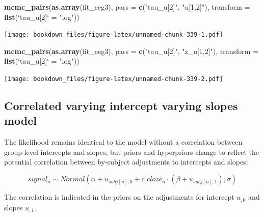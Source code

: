 \documentclass[12pt,]{krantz}
\newenvironment{Shaded}{\begin{snugshade}}{\end{snugshade}}
\newcommand{\DataTypeTok}[1]{\textcolor[rgb]{0.13,0.29,0.53}{#1}}
\newcommand{\KeywordTok}[1]{\textcolor[rgb]{0.13,0.29,0.53}{\textbf{#1}}}
\newcommand{\NormalTok}[1]{#1}
\newcommand{\StringTok}[1]{\textcolor[rgb]{0.31,0.60,0.02}{#1}}
\theoremstyle{definition}
\theoremstyle{definition}
\theoremstyle{definition}
\theoremstyle{remark}
\begin{document}
\begin{Shaded}
\begin{Highlighting}[]
\KeywordTok{mcmc_pairs}\NormalTok{(}\KeywordTok{as.array}\NormalTok{(fit_eeg3), }\DataTypeTok{pars =} \KeywordTok{c}\NormalTok{(}\StringTok{"tau_u[2]"}\NormalTok{, }\StringTok{"u[1,2]"}\NormalTok{),}
           \DataTypeTok{transform =} \KeywordTok{list}\NormalTok{(}\StringTok{`}\DataTypeTok{tau_u[2]}\StringTok{`}\NormalTok{ =}\StringTok{ "log"}\NormalTok{))}
\end{Highlighting}
\end{Shaded}

\texttt{[image: bookdown\_files/figure-latex/unnamed-chunk-339-1.pdf]}

\begin{Shaded}
\begin{Highlighting}[]
\KeywordTok{mcmc_pairs}\NormalTok{(}\KeywordTok{as.array}\NormalTok{(fit_eeg3), }\DataTypeTok{pars =} \KeywordTok{c}\NormalTok{(}\StringTok{"tau_u[2]"}\NormalTok{, }\StringTok{"z_u[1,2]"}\NormalTok{),}
           \DataTypeTok{transform =} \KeywordTok{list}\NormalTok{(}\StringTok{`}\DataTypeTok{tau_u[2]}\StringTok{`}\NormalTok{ =}\StringTok{ "log"}\NormalTok{))}
\end{Highlighting}
\end{Shaded}

\texttt{[image: bookdown\_files/figure-latex/unnamed-chunk-339-2.pdf]}

\hypertarget{sec:corrstan}{%
\subsection{Correlated varying intercept varying slopes model}\label{sec:corrstan}}

The likelihood remains identical to the model without a correlation between group-level intercepts and slopes, but priors and hyperpriors change to reflect the potential correlation between by-subject adjustments to intercepts and slopes:

\begin{equation}
  signal_n \sim Normal(\alpha + u_{subj[n],0} + c\_cloze_n \cdot  (\beta + u_{subj[n],1}),\sigma)
\end{equation}

The correlation is indicated in the priors on the adjustments for intercept \(u_{,0}\) and slopes \(u_{,1}\).
\end{document}
